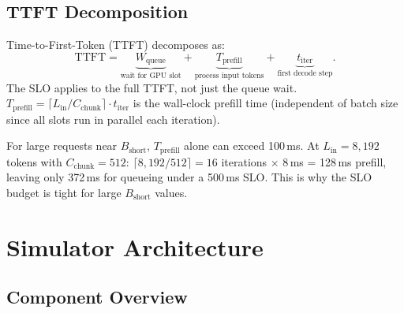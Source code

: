 \documentclass[11pt,a4paper]{article}
\newcommand{\Bshort}{B_{\text{short}}}
\begin{document}
\subsection{TTFT Decomposition}
\label{sec:ttft}

Time-to-First-Token (TTFT) decomposes as:
\begin{equation}
  \text{TTFT} = \underbrace{W_{\text{queue}}}_{\text{wait for GPU slot}}
    + \underbrace{T_{\text{prefill}}}_{\text{process input tokens}}
    + \underbrace{t_{\text{iter}}}_{\text{first decode step}}.
\end{equation}
The SLO applies to the full TTFT, not just the queue wait.
$T_{\text{prefill}} = \lceil L_{\text{in}}/C_{\text{chunk}}\rceil
\cdot t_{\text{iter}}$ is the wall-clock prefill time (independent of
batch size since all slots run in parallel each iteration).

\begin{warning}
  For large requests near $\Bshort$, $T_{\text{prefill}}$ alone can
  exceed 100\,ms.  At $L_{\text{in}} = 8{,}192$ tokens with
  $C_{\text{chunk}} = 512$: $\lceil 8{,}192/512 \rceil = 16$
  iterations $\times$ 8\,ms = 128\,ms prefill, leaving only 372\,ms
  for queueing under a 500\,ms SLO.  This is why the SLO budget is
  tight for large $\Bshort$ values.
\end{warning}

\section{Simulator Architecture}
\label{sec:architecture}

\subsection{Component Overview}
\end{document}
